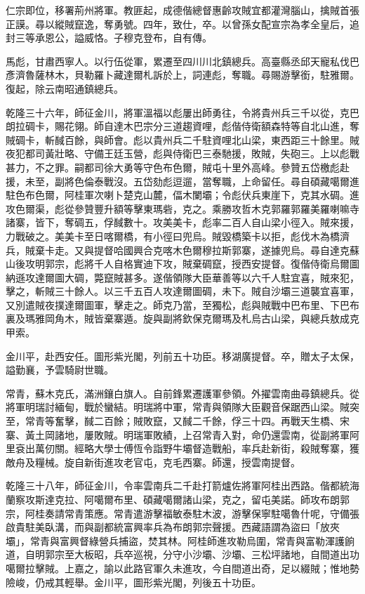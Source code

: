 \begin{pinyinscope}
仁宗即位，移署荊州將軍。教匪起，成德偕總督惠齡攻賊宜都灌灣腦山，擒賊首張正謨。尋以縱賊竄逸，奪勇號。四年，致仕，卒。以曾孫女配宣宗為孝全皇后，追封三等承恩公，謚威恪。子穆克登布，自有傳。

馬彪，甘肅西寧人。以行伍從軍，累遷至四川川北鎮總兵。高臺縣丞邱天寵私伐巴彥濟魯薩林木，貝勒羅卜藏達爾札訴於上，詞連彪，奪職。尋賜游擊銜，駐雅爾。復起，除云南昭通鎮總兵。

乾隆三十六年，師征金川，將軍溫福以彪屢出師勇往，令將貴州兵三千以從，克巴朗拉碉卡，賜花翎。師自達木巴宗分三道趨資哩，彪偕侍衛額森特等自北山進，奪賊碉卡，斬馘百餘，與師會。彪以貴州兵二千駐資哩北山梁，東西距三十餘里。賊夜犯都司黃壯略、守備王廷玉營，彪與侍衛巴三泰馳援，敗賊，失砲三。上以彪戰甚力，不之罪。嗣都司徐大勇等守色布色爾，賊屯十里外高峰。參贊五岱檄彪赴援，未至，副將色倫泰戰沒。五岱劾彪逗遛，當奪職，上命留任。尋自碩藏噶爾進駐色布色爾，阿桂軍次喇卜楚克山麓，偪木闌壩；令彪伏兵東崖下，克其水碉。進攻色爾渠，彪從參贊豐升額等擊東瑪砦，克之。乘勝攻哲木克郭羅郭羅美羅喇嘛寺諸寨，皆下，奪碉五，俘馘數十。攻美美卡，彪率二百人自山梁小徑入。賊來援，力戰破之。美美卡至日喀爾橋，有小徑曰兜烏。賊毀橋築卡以拒，彪伐木為橋濟兵，賊棄卡走。又與提督哈國興合克喀木色爾穆拉斯郭寨，遂據兜烏。尋自達克蘇山後攻明郭宗，彪將千人自格實迪下攻，賊棄碉竄，授西安提督。復偕侍衛烏爾圖納遜攻達爾圖大碉，斃竄賊甚多。遂偕領隊大臣華善等以六千人駐宜喜，賊來犯，擊之，斬賊三十餘人。以三千五百人攻達爾圖碉，未下。賊自沙壩三道襲宜喜軍，又別遣賊夜撲達爾圖軍，擊走之。師克乃當，至獨松，彪與賊戰中巴布里、下巴布裏及瑪雅岡角木，賊皆棄寨遁。旋與副將欽保克爾瑪及札烏古山梁，與總兵敖成克甲索。

金川平，赴西安任。圖形紫光閣，列前五十功臣。移湖廣提督。卒，贈太子太保，謚勤襄，予雲騎尉世職。

常青，蘇木克氏，滿洲鑲白旗人。自前鋒累遷護軍參領。外擢雲南曲尋鎮總兵。從將軍明瑞討緬甸，戰於蠻結。明瑞將中軍，常青與領隊大臣觀音保踞西山梁。賊突至，常青等奮擊，馘二百餘；賊敗竄，又馘二千餘，俘三十四。再戰天生橋、宋寨、黃土岡諸地，屢敗賊。明瑞軍敗績，上召常青入對，命仍還雲南，從副將軍阿里袞出萬仞關。經略大學士傅恆令詣野牛壩督造戰船，率兵赴新街，殺賊奪寨，獲敵舟及糧械。旋自新街進攻老官屯，克毛西寨。師還，授雲南提督。

乾隆三十八年，師征金川，令率雲南兵二千赴打箭爐佐將軍阿桂出西路。偕都統海蘭察攻斯達克拉、阿噶爾布里、碩藏噶爾諸山梁，克之，留屯美諾。師攻布朗郭宗，阿桂奏請常青策應。常青遣游擊福敏泰駐木波，游擊保寧駐噶魯什呢，守備張啟貴駐美臥溝，而與副都統富興率兵為布朗郭宗聲援。西藏語謂為盜曰「放夾壩」，常青與富興督綠營兵捕盜，焚其林。阿桂師進攻勒烏圍，常青與富勒渾護餉道，自明郭宗至大板昭，兵卒巡視，分守小沙壩、沙壩、三松坪諸地，自間道出功噶爾拉擊賊。上嘉之，諭以此路官軍久未進攻，今自間道出奇，足以綴賊；惟地勢險峻，仍戒其輕舉。金川平，圖形紫光閣，列後五十功臣。


\end{pinyinscope}
